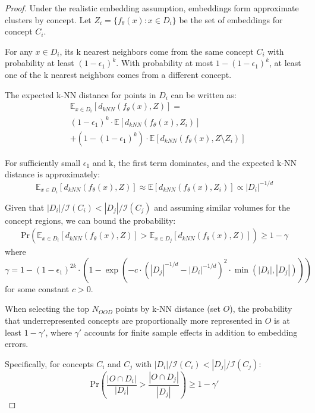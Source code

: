 \begin{proof}
Under the realistic embedding assumption, embeddings form approximate clusters by concept. Let $Z_i = \{f_\theta(x) : x \in D_i\}$ be the set of embeddings for concept $C_i$.

For any $x \in D_i$, its k nearest neighbors come from the same concept $C_i$ with probability at least $(1 - \epsilon_1)^k$. With probability at most $1 - (1 - \epsilon_1)^k$, at least one of the k nearest neighbors comes from a different concept.

The expected k-NN distance for points in $D_i$ can be written as:
\begin{equation}
\begin{aligned}
&\mathbb{E}_{x \in D_i}[d_{kNN}(f_\theta(x), Z)] =\\ &(1 - \epsilon_1)^k \cdot \mathbb{E}[d_{kNN}(f_\theta(x), Z_i)]\\
&+ (1 - (1 - \epsilon_1)^k) \cdot \mathbb{E}[d_{kNN}(f_\theta(x), Z \setminus Z_i)]
\end{aligned}
\end{equation}

\noindent
For sufficiently small $\epsilon_1$ and k, the first term dominates, and the expected k-NN distance is approximately:
\begin{equation}
\mathbb{E}_{x \in D_i}[d_{kNN}(f_\theta(x), Z)] \approx \mathbb{E}[d_{kNN}(f_\theta(x), Z_i)] \propto |D_i|^{-1/d}
\end{equation}

\noindent
Given that $|D_i|/\mathcal{I}(C_i) < |D_j|/\mathcal{I}(C_j)$ and assuming similar volumes for the concept regions, we can bound the probability:
\begin{align}
\mathrm{Pr}(\mathbb{E}_{x \in D_i}[d_{kNN}(f_\theta(x), Z)] > \mathbb{E}_{x \in D_j}[d_{kNN}(f_\theta(x), Z)]) \geq 1 - \gamma
\end{align}
where $\gamma = 1 - (1 - \epsilon_1)^{2k} \cdot (1 - \exp(-c \cdot (|D_j|^{-1/d} - |D_i|^{-1/d})^2 \cdot \min(|D_i|, |D_j|)))$ for some constant $c > 0$.

\noindent
When selecting the top $N_{OOD}$ points by k-NN distance (set $O$), the probability that underrepresented concepts are proportionally more represented in $O$ is at least $1 - \gamma'$, where $\gamma'$ accounts for finite sample effects in addition to embedding errors.

\noindent
Specifically, for concepts $C_i$ and $C_j$ with $|D_i|/\mathcal{I}(C_i) < |D_j|/\mathcal{I}(C_j)$:
\begin{equation}
\mathrm{Pr}\left(\frac{|O \cap D_i|}{|D_i|} > \frac{|O \cap D_j|}{|D_j|}\right) \geq 1 - \gamma'
\end{equation}


\end{proof}
